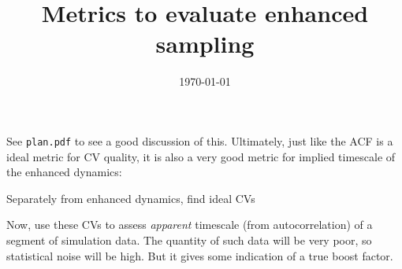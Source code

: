 \documentclass[twocolumn]{notes}
\begin{document}
\title{Metrics to evaluate enhanced sampling}
\date{\today} %
\maketitle
\tableofcontents
\newpage

See \texttt{plan.pdf} to see a good discussion of this.  Ultimately, just like the ACF is a ideal metric for CV quality, it is also a very good metric for implied timescale of the enhanced dynamics:
\begin{enumeratec}
    \item Separately from enhanced dynamics, find ideal CVs
    \item Now, use these CVs to assess \emph{apparent} timescale (from autocorrelation) of a segment of simulation data.  The quantity of such data will be very poor, so statistical noise will be high.  But it gives some indication of a true boost factor.
\end{enumeratec}


\end{document}
